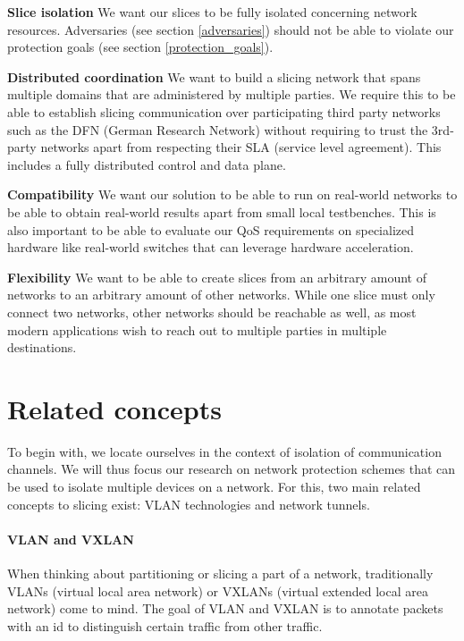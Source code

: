 \begin{description}[style=multiline, labelwidth=0.7cm]
    \item[\namedlabel{R1}{R1}] \textbf{Slice isolation} We want our slices to be fully isolated concerning network resources. Adversaries (see section \ref{adversaries}) should not be able to violate our protection goals (see section \ref{protection_goals}).
    \item[\namedlabel{R2}{R2}] \textbf{Distributed coordination} We want to build a slicing network that spans multiple domains that are administered by multiple parties. We require this to be able to establish slicing communication over participating third party networks such as the DFN (German Research Network) without requiring to trust the 3rd-party networks apart from respecting their SLA (service level agreement). This includes a fully distributed control and data plane.
    \item[\namedlabel{R3}{R3}] \textbf{Compatibility} We want our solution to be able to run on real-world networks to be able to obtain real-world results apart from small local testbenches. This is also important to be able to evaluate our QoS requirements on specialized hardware like real-world switches that can leverage hardware acceleration.
    \item[\namedlabel{R4}{R4}] \textbf{Flexibility} We want to be able to create slices from an arbitrary amount of networks to an arbitrary amount of other networks. While one slice must only connect two networks, other networks should be reachable as well, as most modern applications wish to reach out to multiple parties in multiple destinations.
\end{description}

\section{Related concepts}
To begin with, we locate ourselves in the context of isolation of communication channels. We will thus focus our research on network protection schemes that can be used to isolate multiple devices on a network. For this, two main related concepts to slicing exist: VLAN technologies and network tunnels.

\paragraph{VLAN and VXLAN} When thinking about partitioning or slicing a part of a network, traditionally VLANs (virtual local area network) \cite{IEEE8021Q} or VXLANs (virtual extended local area network) \cite{rfc7348} come to mind. The goal of VLAN and VXLAN is to annotate packets with an id to distinguish certain traffic from other traffic.

